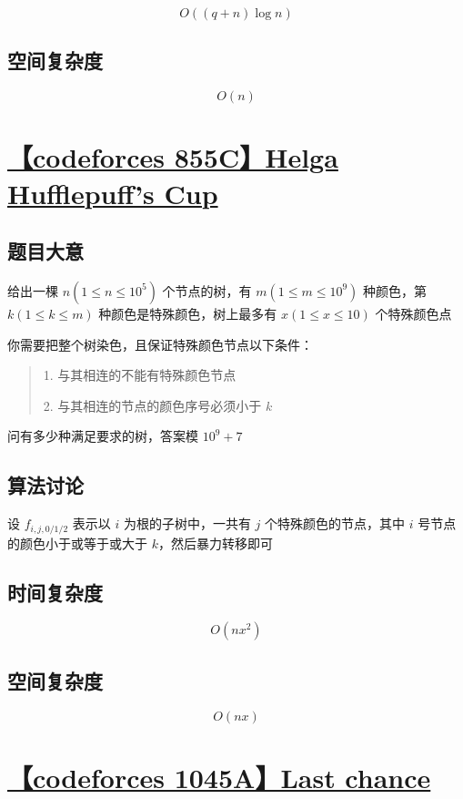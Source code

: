 \documentclass[UTF8]{article}
\begin{document}
$$
O((q + n) \log n)
$$

\subsection{空间复杂度}

$$
O(n)
$$

\section{\href{https://codeforces.com/problemset/problem/855/C}{【codeforces 855C】Helga Hufflepuff's Cup}}

\subsection{题目大意}

给出一棵 $n(1 \le n \le 10^5)$ 个节点的树，有 $m(1 \le m \le 10^9)$ 种颜色，第 $k(1 \le k \le m)$ 种颜色是特殊颜色，树上最多有 $x(1 \le x \le 10)$ 个特殊颜色点

你需要把整个树染色，且保证特殊颜色节点以下条件： 

\begin{quotation}

1. 与其相连的不能有特殊颜色节点

2. 与其相连的节点的颜色序号必须小于 $k$
	
\end{quotation}

问有多少种满足要求的树，答案模 $10^9+7$

\subsection{算法讨论}

设 $f_{i, j, 0/1/2}$ 表示以 $i$ 为根的子树中，一共有 $j$ 个特殊颜色的节点，其中 $i$ 号节点的颜色小于或等于或大于 $k$，然后暴力转移即可

\subsection{时间复杂度}

$$
O(nx^2)
$$

\subsection{空间复杂度}

$$
O(nx)
$$

\section{\href{https://codeforces.com/problemset/problem/1045/A}{【codeforces 1045A】Last chance}}
\end{document}
